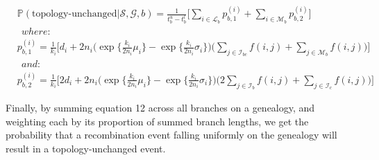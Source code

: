 \documentclass[11pt]{article}
\begin{document}
\begin{equation}
\begin{aligned}
	&\mathbb{P}(\textrm{topology-unchanged} | \mathcal{S},\mathcal{G},b) = 
	\frac{1}{t_b^u - t_b^l} \Bigg[
		\sum_{i \in \mathcal{L}_b} p_{b,1}^{(i)} + 
		\sum_{i \in \mathcal{M}_b} p_{b,2}^{(i)}
	\Bigg]
	\\
	&~~where: 
	\\
	&p_{b,1}^{(i)} = 
		\frac{1}{k_i} \Bigg[
			d_i + 2n_i \Bigg(
				\exp\bigg\{ \frac{k_i}{2n_i}\mu_i \bigg\} - 
				\exp\bigg\{ \frac{k_i}{2n_i}\sigma_i\bigg\}
			\Bigg)
		\Bigg(
			\sum_{j \in \mathcal{I}_{bc}}f(i,j) + \sum_{j \in \mathcal{M}_b}f(i,j)
		\Bigg)
	\Bigg]
	\\
	&~~and: 
	\\
	&p_{b,2}^{(i)} = 
		\frac{1}{k_i} \Bigg[
			2d_i + 2n_i \Bigg(
				\exp\bigg\{\frac{k_i}{2n_i}\mu_i \bigg\} - 
				\exp\bigg\{\frac{k_i}{2n_i}\sigma_{i} \bigg\}
			\Bigg)
		\Bigg(
			2\sum_{j \in \mathcal{I}_b} f(i,j) + \sum_{j \in \mathcal{I}_c} f(i,j)
		\Bigg)
	\Bigg]
    \end{aligned}
\end{equation}




\noindent Finally, by summing equation 12 across all branches on a 
genealogy, and weighting each by its proportion of summed branch lengths,
we get the probability that a recombination event falling 
uniformly on the genealogy will result in a topology-unchanged event.
\end{document}
